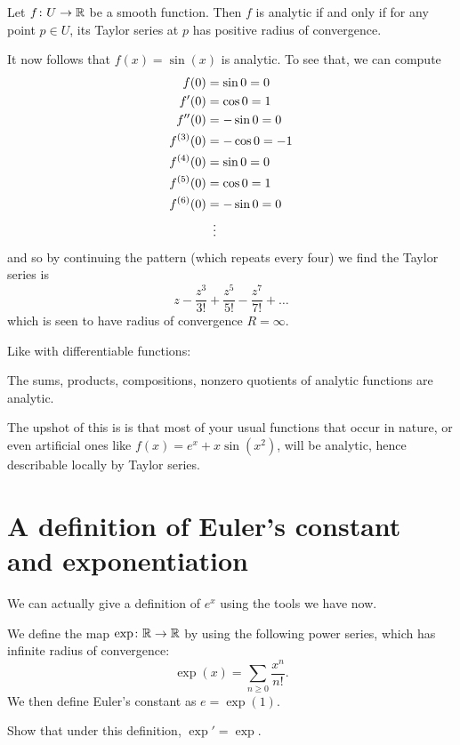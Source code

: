 \begin{theorem}
	Let $f \colon U \to \mathbb R$ be a smooth function.
	Then $f$ is analytic if and only if for any point $p \in U$,
	its Taylor series at $p$ has positive radius of convergence.
\end{theorem}

\begin{example}
	It now follows that $f(x) = \sin(x)$ is analytic.
	To see that, we can compute
	\begin{align*}
		f(0) &= \sin 0 = 0 \\
		f'(0) &= \cos 0 = 1 \\
		f''(0) &= -\sin 0 = 0 \\
		f^{(3)}(0) &= -\cos 0 = -1 \\
		f^{(4)}(0) &= \sin 0 = 0 \\
		f^{(5)}(0) &= \cos 0 = 1 \\
		f^{(6)}(0) &= -\sin 0 = 0 \\
		&\vdotswithin=
	\end{align*}
	and so by continuing the pattern
	(which repeats every four) we find the Taylor series is
	\[ z - \frac{z^3}{3!} + \frac{z^5}{5!} - \frac{z^7}{7!} + \dots \]
	which is seen to have radius of convergence $R = \infty$.
\end{example}

Like with differentiable functions:
\begin{proposition}
	The sums, products, compositions, nonzero quotients
	of analytic functions are analytic.
\end{proposition}
The upshot of this is is that most of your usual
functions that occur in nature,
or even artificial ones like $f(x) = e^x + x \sin(x^2)$,
will be analytic, hence describable locally by Taylor series.

\section{A definition of Euler's constant and exponentiation}
We can actually give a definition of $e^x$ using the tools we have now.

\begin{definition}
	We define the map $\exp \colon \mathbb R \to \mathbb R$ by
	using the following power series,
	which has infinite radius of convergence:
	\[ \exp(x) = \sum_{n \ge 0} \frac{x^n}{n!}. \]
	We then define Euler's constant as $e = \exp(1)$.
\end{definition}
\begin{ques}
	Show that under this definition, $\exp' = \exp$.
\end{ques}

